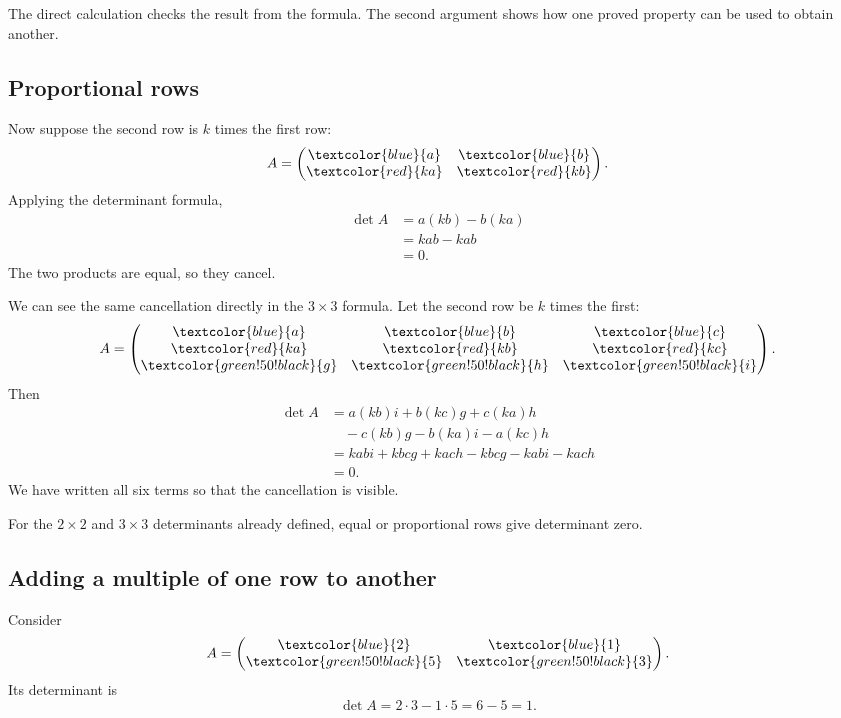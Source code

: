 The direct calculation checks the result from the formula. The second argument shows how one proved property can be used to obtain another.

\subsection{Proportional rows}

Now suppose the second row is \(k\) times the first row:
\[
A=
\begin{pmatrix}
\textcolor{blue}{a}&\textcolor{blue}{b}\\
\textcolor{red}{ka}&\textcolor{red}{kb}
\end{pmatrix}.
\]
Applying the determinant formula,
\[
\begin{aligned}
\det A
&=a(kb)-b(ka)\\
&=kab-kab\\
&=0.
\end{aligned}
\]
The two products are equal, so they cancel.

We can see the same cancellation directly in the \(3\times3\) formula. Let the second row be \(k\) times the first:
\[
A=
\begin{pmatrix}
\textcolor{blue}{a}&\textcolor{blue}{b}&\textcolor{blue}{c}\\
\textcolor{red}{ka}&\textcolor{red}{kb}&\textcolor{red}{kc}\\
\textcolor{green!50!black}{g}&\textcolor{green!50!black}{h}&\textcolor{green!50!black}{i}
\end{pmatrix}.
\]
Then
\[
\begin{aligned}
\det A
&=a(kb)i+b(kc)g+c(ka)h\\
&\quad-c(kb)g-b(ka)i-a(kc)h\\
&=kabi+kbcg+kach-kbcg-kabi-kach\\
&=0.
\end{aligned}
\]
We have written all six terms so that the cancellation is visible.

\begin{theorembox}
For the \(2\times2\) and \(3\times3\) determinants already defined, equal or proportional rows give determinant zero.
\end{theorembox}

\subsection{Adding a multiple of one row to another}

Consider
\[
A=
\begin{pmatrix}
\textcolor{blue}{2}&\textcolor{blue}{1}\\
\textcolor{green!50!black}{5}&\textcolor{green!50!black}{3}
\end{pmatrix}.
\]
Its determinant is
\[
\det A=2\cdot3-1\cdot5=6-5=1.
\]

